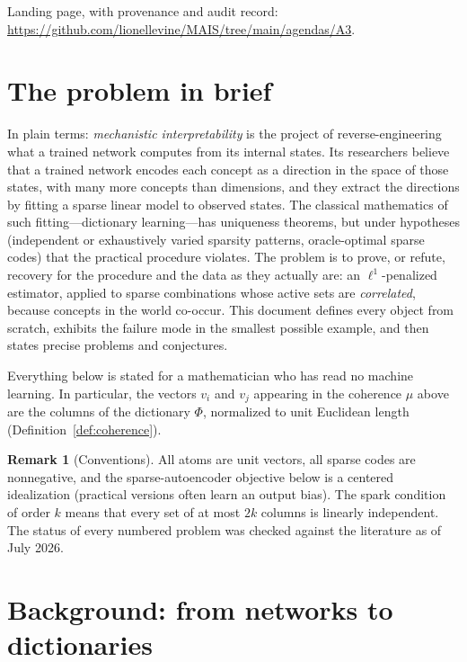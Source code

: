 \documentclass[11pt]{amsart}
\theoremstyle{plain}
\theoremstyle{definition}
\newtheorem{remark}[theorem]{Remark}
\begin{document}
\noindent Landing page, with provenance and audit record: \url{https://github.com/lionellevine/MAIS/tree/main/agendas/A3}.

\section{The problem in brief}\label{sec:brief}



In plain terms: \emph{mechanistic interpretability} is the project of reverse-engineering what a trained network computes from its internal states. Its researchers believe that a trained network encodes each concept as a direction in the space of those states, with many more concepts than dimensions, and they extract the directions by fitting a sparse linear model to observed states. The classical mathematics of such fitting---dictionary learning---has uniqueness theorems, but under hypotheses (independent or exhaustively varied sparsity patterns, oracle-optimal sparse codes) that the practical procedure violates. The problem is to prove, or refute, recovery for the procedure and the data as they actually are: an $\ell^1$-penalized estimator, applied to sparse combinations whose active sets are \emph{correlated}, because concepts in the world co-occur. This document defines every object from scratch, exhibits the failure mode in the smallest possible example, and then states precise problems and conjectures.

Everything below is stated for a mathematician who has read no machine learning. In particular, the vectors $v_i$ and $v_j$ appearing in the coherence $\mu$ above are the columns of the dictionary $\Phi$, normalized to unit Euclidean length (Definition~\ref{def:coherence}).

\begin{remark}[Conventions]
All atoms are unit vectors, all sparse codes are nonnegative, and the sparse-autoencoder objective below is a centered idealization (practical versions often learn an output bias). The spark condition of order $k$ means that every set of at most $2k$ columns is linearly independent. The status of every numbered problem was checked against the literature as of July 2026.
\end{remark}

\section{Background: from networks to dictionaries}\label{sec:background}
\end{document}

